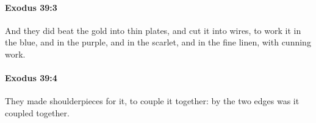 		\paragraph{Exodus 39:3} %
			\label{EXODUS-39-3}

			And they did beat the gold into thin plates, and cut it into wires, to work it in the blue, and in the purple, and in the scarlet, and in the fine linen, with cunning work.


		\paragraph{Exodus 39:4} %
			\label{EXODUS-39-4}

			They made shoulderpieces for it, to couple it together: by the two edges was it coupled together.


